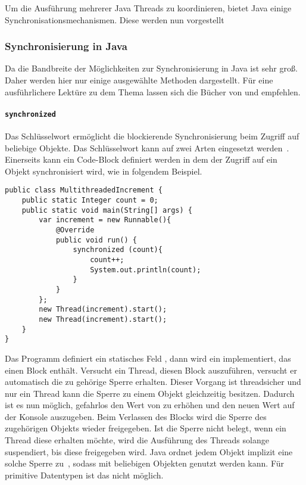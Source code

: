 Um die Ausführung mehrerer Java Threads zu koordinieren, bietet Java einige Synchronisationsmechanismen. Diese werden nun vorgestellt

\subsubsection{Synchronisierung in Java}
Da die Bandbreite der Möglichkeiten zur Synchronisierung in Java ist sehr groß. Daher werden hier nur einige ausgewählte Methoden dargestellt. Für eine ausführlichere Lektüre zu dem Thema lassen sich die Bücher von \textcite{Friesen2015} und \textcite{Hettel2016} empfehlen.

\paragraph{\texttt{synchronized}} Das Schlüsselwort  ermöglicht die blockierende Synchronisierung beim Zugriff auf beliebige Objekte. Das Schlüsselwort kann auf zwei Arten eingesetzt werden~\Cite[S.~339~ff.]{Rauber2006}. Einerseits kann ein Code-Block definiert werden in dem der Zugriff auf ein Objekt synchronisiert wird, wie in folgendem Beispiel.
\begin{lstlisting}
public class MultithreadedIncrement {
	public static Integer count = 0;
	public static void main(String[] args) {
		var increment = new Runnable(){
			@Override
			public void run() {
				synchronized (count){
					count++;
					System.out.println(count);
				}
			}
		};
		new Thread(increment).start();
		new Thread(increment).start();
	}
}	
\end{lstlisting}
Das Programm definiert ein statisches Feld , dann wird ein  implementiert, das einen  Block enthält. Versucht ein Thread, diesen Block auszuführen, versucht er automatisch die zu  gehörige Sperre erhalten. Dieser Vorgang ist threadsicher und nur ein Thread kann die Sperre zu einem Objekt gleichzeitig besitzen. Dadurch ist es nun möglich, gefahrlos den Wert von  zu erhöhen und den neuen Wert auf der Konsole auszugeben. Beim Verlassen des  Blocks wird die Sperre des zugehörigen Objekts wieder freigegeben. Ist die Sperre nicht belegt, wenn ein Thread diese erhalten möchte, wird die Ausführung des Threads solange suspendiert, bis diese freigegeben wird. Java ordnet jedem Objekt implizit eine solche Sperre zu~\cite{Friesen2015}, sodass  mit beliebigen Objekten genutzt werden kann. Für primitive Datentypen ist das nicht möglich.

